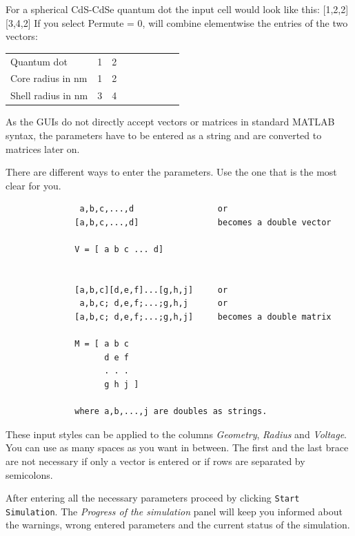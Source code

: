 \begin{enumerate}
							\begin{EXAMPLE}
								For a spherical CdS-CdSe quantum dot the input cell would look like this: [1,2,2][3,4,2]
								If you select Permute = 0, \software will combine elementwise the entries of the two vectors: \\
								\newline
								\begin{tabular}{@{}lcccccccc}
									Quantum dot					&	1	&	2	\\
									Core radius	in nm		&	1	& 2	\\
									Shell radius in nm	& 3	& 4	\\
								\end{tabular}
							\end{EXAMPLE}
			\end{enumerate}
			
			\begin{REMARK} 
				As the \matlab \gls{GUI}s do not directly accept vectors or matrices in standard MATLAB syntax, the parameters
				have to be entered as a string and are converted to matrices later on.
				
				There are different ways to enter the parameters. Use the one that is the most clear for you.
				\begin{lstlisting}
               a,b,c,...,d                 or
              [a,b,c,...,d]                becomes a double vector

              V = [ a b c ... d]


              [a,b,c][d,e,f]...[g,h,j]     or
               a,b,c; d,e,f;...;g,h,j      or
              [a,b,c; d,e,f;...;g,h,j]     becomes a double matrix

              M = [ a b c
                    d e f
                    . . .
                    g h j ]

              where a,b,...,j are doubles as strings.
   			\end{lstlisting}
   			These input styles can be applied to the columns {\it Geometry}, {\it Radius} and {\it Voltage}.	\\
   			You can use as many spaces as you want in between. The first and the last brace are not necessary if only a vector is entered or if
   			rows are separated by semicolons.
			\end{REMARK}
			
			After entering all the necessary parameters proceed by clicking \lstinline{Start Simulation}. The {\it Progress of the simulation} panel will
			keep you informed about the warnings, wrong entered parameters and the current status of the simulation.
			

